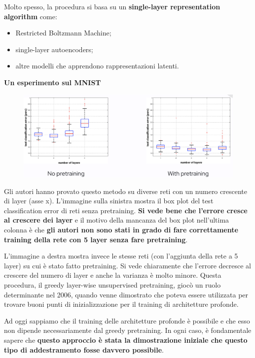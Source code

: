 Molto spesso, la procedura si basa su un \textbf{single-layer representation algorithm} come:
\begin{itemize}
  \item Restricted Boltzmann Machine;
  \item single-layer autoencoders;
  \item altre modelli che apprendono rappresentazioni latenti.
\end{itemize}
\newpage

\textbf{Un esperimento sul MNIST} 



\begin{figure}[!h]
  \includegraphics[scale=.45]{images/representation_learning/experiment.png}
  \centering
\end{figure}



Gli autori hanno provato questo metodo su diverse reti con un numero crescente di layer (asse x). 
L'immagine sulla sinistra mostra il box plot del test classification error di reti senza pretraining. 
\textbf{Si vede bene che l'errore cresce al crescere dei layer} e il motivo della mancanza del box plot 
nell'ultima colonna è che \textbf{gli autori non sono stati in grado di fare correttamente training della 
rete con 5 layer senza fare pretraining}.


L'immagine a destra mostra invece le stesse reti (con l'aggiunta della rete a 5 layer) su cui è stato fatto
pretraining. Si vede chiaramente che l'errore decresce al crescere del numero di layer e anche la varianza
è molto minore.
\newline
\newline
Questa procedura, il greedy layer-wise unsupervised pretraining, giocò un ruolo determinante nel 2006, quando
venne dimostrato che poteva essere utilizzata per trovare buoni punti di inizializzazione per il training di
architetture profonde.


Ad oggi sappiamo che il training delle architetture profonde è possibile e che esso non dipende necessariamente
dal greedy pretraining. In ogni caso, è fondamentale sapere che \textbf{questo approccio è stata la 
dimostrazione iniziale che questo tipo di addestramento fosse davvero possibile}.
\newpage
